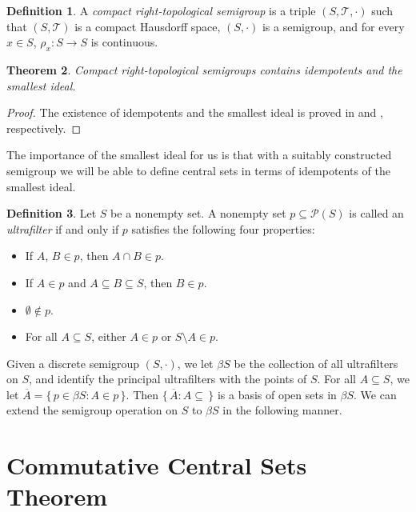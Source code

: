 \documentclass[12pt]{article}
\theoremstyle{plain}
\newtheorem{thm}{Theorem}[section]
\theoremstyle{definition}
\newtheorem{defn}[thm]{Definition}
\newcommand{\calP}{\mathcal{P}}
\newcommand{\calT}{\mathcal{T}}
\begin{document}
\begin{defn}
  A \textsl{compact right-topological semigroup} is a triple $(S,
  \calT, \cdot)$ such that $(S, \calT)$ is a compact Hausdorff space, $(S, \cdot)$ is
  a semigroup, and for every $x \in S$, $\rho_x \colon S
  \to S$ is continuous. 
\end{defn}

\begin{thm}
  Compact right-topological semigroups contains idempotents and
  the smallest ideal.
\end{thm}
\begin{proof}
  The existence of idempotents and the smallest ideal is proved in \cite[Theorem
  2.5]{Hindman:1998fk} and \cite[Theorem 2.8]{Hindman:1998fk}, respectively.
\end{proof}
The importance of the smallest ideal for us is that with a suitably
constructed semigroup we will be able to define central sets in terms
of idempotents of the smallest ideal.

\begin{defn}
  Let $S$ be a nonempty set.
  A nonempty set $p \subseteq \calP(S)$ is called an
  \textsl{ultrafilter} if and only if $p$ satisfies the following
  four properties: 
  \begin{itemize}
    \item[(1)] If $A$, $B \in p$, then $A \cap B \in p$.
    \item[(2)] If $A \in p$ and $A \subseteq B \subseteq S$, then $B
      \in p$.
    \item[(3)] $\emptyset \not\in p$.
    \item[(4)] For all $A \subseteq S$, either $A \in p$ or $S
      \setminus A \in p$. 
  \end{itemize}
\end{defn}

Given a discrete semigroup $(S,\cdot)$, we let $\beta S$ be the
collection of all ultrafilters on $S$, and identify the principal
ultrafilters with the points of $S$. 
For all $A \subseteq S$, we let $\overline{A} = \{\, p \in \beta S : A
\in p \,\}$. 
Then $\{\, \overline{A} : A \subseteq \,\}$ is a basis of open sets in
$\beta S$.
We can extend the semigroup operation on $S$ to $\beta S$ in the
following manner.

\section{Commutative Central Sets Theorem}
\end{document}
